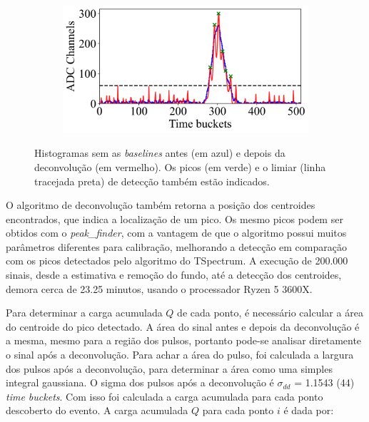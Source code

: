 \documentclass[a4paper,12pt,oneside]{book}
\begin{document}
\begin{figure}[H]
\begin{subfigure}[b]{0.48\textwidth}
        \caption{}
        \label{subfig:ex_sinal_deconv_3}
    \end{subfigure}%
    \hfill
    \begin{subfigure}[b]{0.48\textwidth}
        \centering
        \includegraphics[scale=0.40]{figs/ex_deconv_4.png}
        \caption{}
        \label{subfig:ex_sinal_deconv_4}
    \end{subfigure}
\caption{Histogramas sem as \textit{baselines} antes (em azul) e depois da deconvolução (em vermelho). Os picos (em verde) e o limiar (linha tracejada preta) de detecção também estão indicados.}
\label{fig:ex_sinal_deconv}
\end{figure}

\par O algoritmo de deconvolução também retorna a posição dos centroides encontrados, que indica a localização de um pico. Os mesmo picos podem ser obtidos com o \textit{peak\_finder}, com a vantagem de que o algoritmo possui muitos parâmetros diferentes para calibração, melhorando a detecção em comparação com os picos detectados pelo algoritmo do TSpectrum. A execução de 200.000 sinais, desde a estimativa e remoção do fundo, até a detecção dos centroides, demora cerca de 23.25 minutos, usando o processador Ryzen 5 3600X.

\par Para determinar a carga acumulada $Q$ de cada ponto, é necessário calcular a área do centroide do pico detectado. A área do sinal antes e depois da deconvolução é a mesma, mesmo para a região dos pulsos, portanto pode-se analisar diretamente o sinal após a deconvolução. Para achar a área do pulso, foi calculada a largura dos pulsos após a deconvolução, para determinar a área como uma simples integral gaussiana. O sigma dos pulsos após a deconvolução é $\sigma_{dd}$ = 1.1543 (44) \textit{time buckets}. Com isso foi calculada a carga acumulada para cada ponto descoberto do evento. A carga acumulada $Q$ para cada ponto $i$ é dada por:
\end{document}
